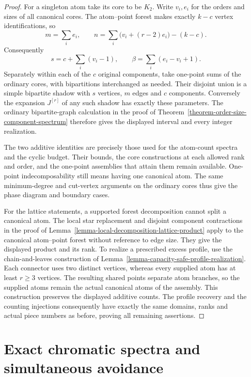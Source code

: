 \documentclass[a4paper,11pt,reqno]{amsart}
\theoremstyle{plain}
\theoremstyle{definition}
\theoremstyle{remark}
\begin{document}
\begin{proof}
For a singleton atom take its core to be $K_2$.  Write $v_i,e_i$ for the
orders and sizes of all canonical cores.  The atom--point forest makes
exactly $k-c$ vertex identifications, so
\[
 m=\sum_i e_i,\qquad
 n=\sum_i\bigl(v_i+(r-2)e_i\bigr)-(k-c).
\]
Consequently
\[
 s=c+\sum_i(v_i-1),\qquad
 \beta=\sum_i(e_i-v_i+1).
\]
Separately within each of the $c$ original components, take one-point sums
of the ordinary cores, with bipartitions interchanged as needed.  Their
disjoint union is a simple bipartite shadow with $s$ vertices, $m$ edges
and $c$ components.  Conversely the expansion $J^{[r]}$ of any such
shadow has exactly these parameters.  The ordinary bipartite-graph
calculation in the proof of
Theorem~\ref{theorem-order-size-component-spectrum} therefore gives the
displayed interval and every integer realization.

The two additive identities are precisely those used for the atom-count
spectra and the cyclic budget.  Their bounds, the core constructions at
each allowed rank and order, and the one-point assemblies that attain
them remain available.  One-point indecomposability still means having
one canonical atom.  The same minimum-degree and cut-vertex arguments
on the ordinary cores thus give the phase diagram and boundary cases.

For the lattice statements, a supported forest decomposition cannot
split a canonical atom.  The local star replacement and disjoint
component contractions in the proof of
Lemma~\ref{lemma-local-decomposition-lattice-product} apply to the
canonical atom--point forest without reference to edge size.  They give
the displayed product and its rank.  To realize a prescribed excess
profile, use the chain-and-leaves construction of
Lemma~\ref{lemma-capacity-safe-profile-realization}.  Each connector
uses two distinct vertices, whereas every supplied atom has at least
$r\ge3$ vertices.  The resulting shared points separate atom branches,
so the supplied atoms remain the actual canonical atoms of the assembly.
This construction preserves the displayed additive counts.  The
profile recovery and the counting injections consequently have exactly
the same domains, ranks and actual piece numbers as before, proving all
remaining assertions.
\end{proof}

\section{Exact chromatic spectra and simultaneous avoidance}
\label{exact-spectra-extension}
\end{document}
